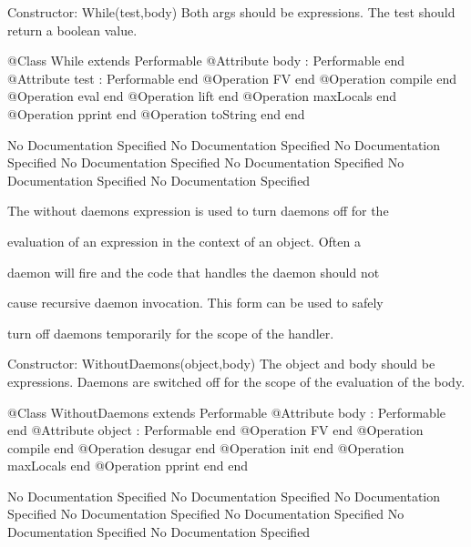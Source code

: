       Constructor: While(test,body)
        Both args should be expressions. The test should return a boolean value.
\begin{Interface}
@Class While extends Performable
  @Attribute body : Performable end
  @Attribute test : Performable end
  @Operation FV end
  @Operation compile end
  @Operation eval end
  @Operation lift end
  @Operation maxLocals end
  @Operation pprint end
  @Operation toString end
end
\end{Interface}
No Documentation Specified
No Documentation Specified
No Documentation Specified
No Documentation Specified
No Documentation Specified
No Documentation Specified
No Documentation Specified

      The without daemons expression is used to turn daemons off for the

      evaluation of an expression in the context of an object. Often a

      daemon will fire and the code that handles the daemon should not

      cause recursive daemon invocation. This form can be used to safely

      turn off daemons temporarily for the scope of the handler.
      
      Constructor: WithoutDaemons(object,body)
        The object and body should be expressions. Daemons are switched 
        off for the scope of the evaluation of the body.
\begin{Interface}
@Class WithoutDaemons extends Performable
  @Attribute body : Performable end
  @Attribute object : Performable end
  @Operation FV end
  @Operation compile end
  @Operation desugar end
  @Operation init end
  @Operation maxLocals end
  @Operation pprint end
end
\end{Interface}
No Documentation Specified
No Documentation Specified
No Documentation Specified
No Documentation Specified
No Documentation Specified
No Documentation Specified
No Documentation Specified

